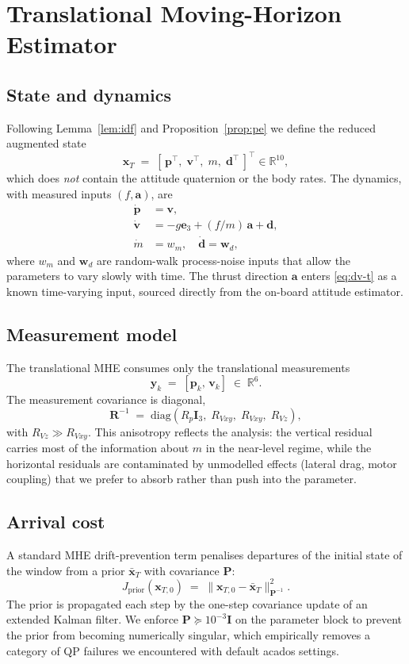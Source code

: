\documentclass[lettersize,journal]{IEEEtran}
\newcommand{\R}{\mathbb{R}}
\newcommand{\vect}[1]{\bm{#1}}
\newcommand{\mat}[1]{\mathbf{#1}}
\begin{document}
\section{Translational Moving-Horizon Estimator}\label{sec:mhe-t}

\subsection{State and dynamics}
Following Lemma~\ref{lem:idf} and Proposition~\ref{prop:pe} we
define the reduced augmented state
\begin{equation}
\vect x_T \;=\; [\,\vect p^\top,\;\vect v^\top,\;m,\;\vect d^\top\,]^\top \in \R^{10},
\end{equation}
which does \emph{not} contain the attitude quaternion or the body
rates.  The dynamics, with measured inputs $(f,\vect a)$, are
\begin{align}
\dot{\vect p} &= \vect v, \\
\dot{\vect v} &= -g\vect e_3 + (f/m)\,\vect a + \vect d, \label{eq:dv-t}\\
\dot m &= w_m, \quad \dot{\vect d} = \vect w_d, \label{eq:rw}
\end{align}
where $w_m$ and $\vect w_d$ are random-walk process-noise inputs
that allow the parameters to vary slowly with time.  The thrust
direction $\vect a$ enters \eqref{eq:dv-t} as a known time-varying
input, sourced directly from the on-board attitude estimator.

\subsection{Measurement model}
The translational MHE consumes only the translational measurements
\begin{equation}
\vect y_k \;=\; [\vect p_k,\,\vect v_k] \;\in\;\R^6.
\end{equation}
The measurement covariance is diagonal,
\[
\mat R^{-1} \;=\; \mathrm{diag}(R_p\mat I_3,\;R_{Vxy},\;R_{Vxy},\;R_{Vz}),
\]
with $R_{Vz}\gg R_{Vxy}$.  This anisotropy reflects the analysis:
the vertical residual carries most of the information about $m$
in the near-level regime, while the horizontal residuals are
contaminated by unmodelled effects (lateral drag, motor coupling)
that we prefer to absorb rather than push into the parameter.

\subsection{Arrival cost}
A standard MHE drift-prevention term penalises departures of the
initial state of the window from a prior $\bar{\vect x}_T$ with
covariance $\mat P$:
\begin{equation}
J_{\text{prior}}(\vect x_{T,0}) \;=\; \|\vect x_{T,0}-\bar{\vect x}_T\|_{\mat P^{-1}}^2.
\end{equation}
The prior is propagated each step by the one-step covariance
update of an extended Kalman filter.  We enforce
$\mat P\succeq 10^{-3}\mat I$ on the parameter block to prevent
the prior from becoming numerically singular, which empirically
removes a category of QP failures we encountered with default
acados settings.
\end{document}
